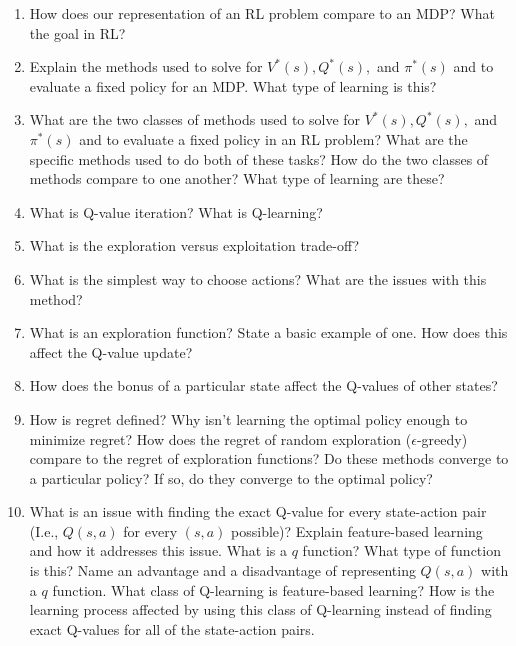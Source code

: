 \documentclass[]{article}
\begin{document}
\begin{enumerate}
	
\item How does our representation of an RL problem compare to an MDP? What the goal in RL?
\item Explain the methods used to solve for $V^{*}(s), Q^{*}(s),$ and $\pi^{*}(s)$ and to evaluate a fixed policy for an MDP. What type of learning is this?
\item What are the two classes of methods used to solve for $V^{*}(s), Q^{*}(s),$ and $\pi^{*}(s)$ and to evaluate a fixed policy in an RL problem? What are the specific methods used to do both of these tasks? How do the two classes of methods compare to one another? What type of learning are these?\\

\item What is Q-value iteration? What is Q-learning?\\

\item What is the exploration versus exploitation trade-off?\\

\item What is the simplest way to choose actions? What are the issues with this method?\\

\item What is an exploration function? State a basic example of one. How does this affect the Q-value update?\\
\item How does the bonus of a particular state affect the Q-values of other states?\\

\item How is regret defined? Why isn't learning the optimal policy enough to minimize regret? How does the regret of random exploration ($\epsilon$-greedy) compare to the regret of exploration functions? Do these methods converge to a particular policy? If so, do they converge to the optimal policy?\\

\item What is an issue with finding the exact Q-value for every state-action pair (I.e., $Q(s,a)$ for every $(s,a)$ possible)? Explain feature-based learning and how it addresses this issue. What is a $q$ function? What type of function is this? Name an advantage and a disadvantage of representing $Q(s,a)$ with a $q$ function. What class of Q-learning is feature-based learning? How is the learning process affected by using this class of Q-learning instead of finding exact Q-values for all of the state-action pairs. \\


\end{enumerate}
\end{document}
